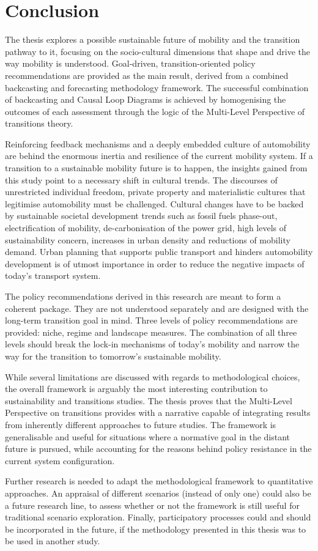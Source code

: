 \chapter{Conclusion}
\label{c:conclusion}

The thesis explores a possible sustainable future of mobility and the transition pathway to it, focusing on the socio-cultural dimensions that shape and drive the way mobility is understood. Goal-driven, transition-oriented policy recommendations are provided as the main result, derived from a combined backcasting and forecasting methodology framework. The successful combination of backcasting and Causal Loop Diagrams is achieved by homogenising the outcomes of each assessment through the logic of the Multi-Level Perspective of transitions theory.

Reinforcing feedback mechanisms and a deeply embedded culture of automobility are behind the enormous inertia and resilience of the current mobility system. If a transition to a sustainable mobility future is to happen, the insights gained from this study point to a necessary shift in cultural trends. The discourses of unrestricted individual freedom, private property and materialistic cultures that legitimise automobility must be challenged. Cultural changes have to be backed by sustainable societal development trends such as fossil fuels phase-out, electrification of mobility, de-carbonisation of the power grid, high levels of sustainability concern, increases in urban density and reductions of mobility demand. Urban planning that supports public transport and hinders automobility development is of utmost importance in order to reduce the negative impacts of today's transport system.

The policy recommendations derived in this research are meant to form a coherent package. They are not understood separately and are designed with the long-term transition goal in mind. Three levels of policy recommendations are provided: niche, regime and landscape measures. The combination of all three levels should break the lock-in mechanisms of today's mobility and narrow the way for the transition to tomorrow's sustainable mobility.

While several limitations are discussed with regards to methodological choices, the overall framework is arguably the most interesting contribution to sustainability and transitions studies. The thesis proves that the Multi-Level Perspective on transitions provides with a narrative capable of integrating results from inherently different approaches to future studies. The framework is generalisable and useful for situations where a normative goal in the distant future is pursued, while accounting for the reasons behind policy resistance in the current system configuration.

Further research is needed to adapt the methodological framework to quantitative approaches. An appraisal of different scenarios (instead of only one) could also be a future research line, to assess whether or not the framework is still useful for traditional scenario exploration. Finally, participatory processes could and should be incorporated in the future, if the methodology presented in this thesis was to be used in another study.